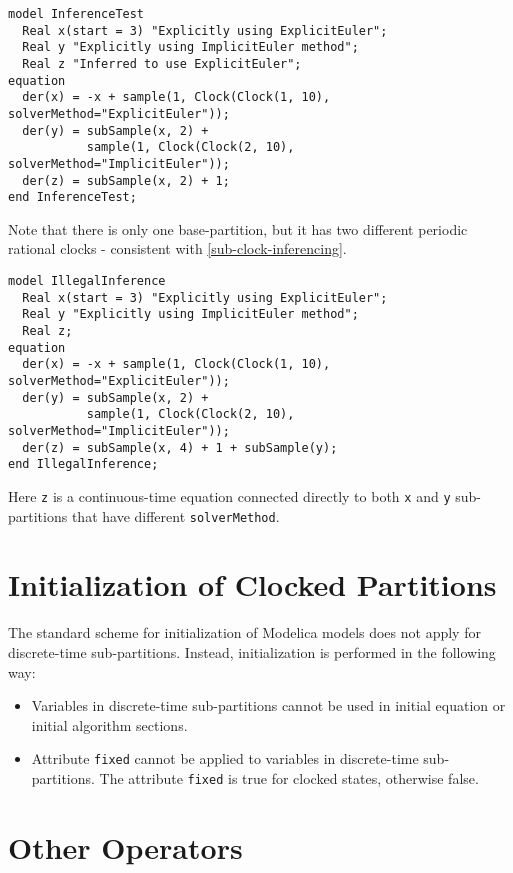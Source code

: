 \begin{example}
\begin{lstlisting}[language=modelica]
model InferenceTest
  Real x(start = 3) "Explicitly using ExplicitEuler";
  Real y "Explicitly using ImplicitEuler method";
  Real z "Inferred to use ExplicitEuler";
equation
  der(x) = -x + sample(1, Clock(Clock(1, 10), solverMethod="ExplicitEuler"));
  der(y) = subSample(x, 2) +
           sample(1, Clock(Clock(2, 10), solverMethod="ImplicitEuler"));
  der(z) = subSample(x, 2) + 1;
end InferenceTest;
\end{lstlisting}
Note that there is only one base-partition, but it has two different periodic rational clocks - consistent with \cref{sub-clock-inferencing}.

\begin{lstlisting}[language=modelica]
model IllegalInference
  Real x(start = 3) "Explicitly using ExplicitEuler";
  Real y "Explicitly using ImplicitEuler method";
  Real z;
equation
  der(x) = -x + sample(1, Clock(Clock(1, 10), solverMethod="ExplicitEuler"));
  der(y) = subSample(x, 2) +
           sample(1, Clock(Clock(2, 10), solverMethod="ImplicitEuler"));
  der(z) = subSample(x, 4) + 1 + subSample(y);
end IllegalInference;
\end{lstlisting}
Here \lstinline!z! is a continuous-time equation connected directly to both \lstinline!x! and \lstinline!y! sub-partitions that have different \lstinline!solverMethod!.
\end{example}

\section{Initialization of Clocked Partitions}\label{initialization-of-clocked-partitions}

The standard scheme for initialization of Modelica models does not apply for discrete-time sub-partitions.
Instead, initialization is performed in the following way:
\begin{itemize}
\item
  Variables in discrete-time sub-partitions cannot be used in initial equation or initial algorithm sections.
\item
  Attribute \lstinline!fixed! cannot be applied to variables in discrete-time sub-partitions.
  The attribute \lstinline!fixed! is true for clocked states, otherwise false.
\end{itemize}

\section{Other Operators}\label{other-operators}


